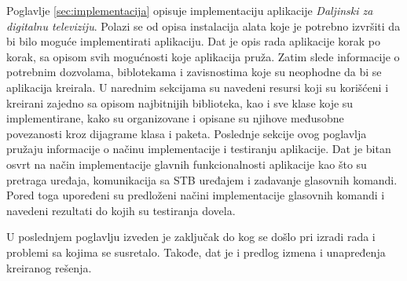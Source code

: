 \documentclass[TamaraIvanovicMasterRad.tex]{subfiles}
\begin{document}
Poglavlje \ref{sec:implementacija} opisuje implementaciju aplikacije \textit{Daljinski za digitalnu televiziju}. Polazi se od opisa instalacija alata koje je potrebno izvršiti da bi bilo moguće implementirati aplikaciju. Dat je opis rada aplikacije korak po korak, sa opisom svih mogućnosti koje aplikacija pruža. Zatim slede informacije o potrebnim dozvolama, biblotekama i zavisnostima koje su neophodne da bi se aplikacija kreirala. U narednim sekcijama su navedeni resursi koji su korišćeni i kreirani zajedno sa opisom najbitnijih biblioteka, kao i sve klase koje su implementirane, kako su organizovane i opisane su njihove međusobne povezanosti kroz dijagrame klasa i paketa. Poslednje sekcije ovog poglavlja pružaju informacije o načinu implementacije i testiranju aplikacije. Dat je bitan osvrt na način implementacije glavnih funkcionalnosti aplikacije kao što su pretraga uređaja, komunikacija sa STB uređajem i zadavanje glasovnih komandi. Pored toga upoređeni su predloženi načini implementacije glasovnih komandi i navedeni rezultati do kojih su testiranja dovela.  

U poslednjem poglavlju izveden je zaključak do kog se došlo pri izradi rada i problemi sa kojima se susretalo. Takođe, dat je i predlog izmena i unapređenja kreiranog rešenja.
\end{document}

